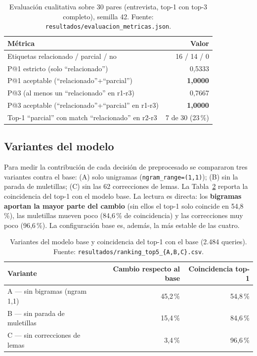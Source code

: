 \documentclass[11pt]{tg_usta}
\begin{document}
\begin{table}[H]
    \centering
    \caption{Evaluación cualitativa sobre 30 pares (entrevista, top-1 con top-3 completo), semilla 42. Fuente: \texttt{resultados/evaluacion\_metricas.json}.}
    \small
    \setlength{\tabcolsep}{6pt}
    \begin{tabular}{l r}
    \toprule
    Métrica & Valor \\
    \midrule
    Etiquetas relacionado / parcial / no & 16 / 14 / 0 \\
    P@1 estricto (solo ``relacionado'') & 0,5333 \\
    P@1 aceptable (``relacionado''+``parcial'') & \textbf{1,0000} \\
    P@3 (al menos un ``relacionado'' en r1-r3) & 0,7667 \\
    P@3 aceptable (``relacionado''+``parcial'' en r1-r3) & \textbf{1,0000} \\
    Top-1 ``parcial'' con match ``relacionado'' en r2-r3 & 7 de 30 (23\,\%) \\
    \bottomrule
    \end{tabular}
    \label{tab:evaluacion}
\end{table}

\subsection{Variantes del modelo}

Para medir la contribución de cada decisión de preprocesado se compararon tres variantes contra el base: (A) solo unigramas (\texttt{ngram\_range=(1,1)}); (B) sin la parada de muletillas; (C) sin las 62 correcciones de lemas. La Tabla~\ref{tab:variantes} reporta la coincidencia del top-1 con el modelo base. La lectura es directa: los \textbf{bigramas aportan la mayor parte del cambio} (sin ellos el top-1 solo coincide en 54,8\,\%), las muletillas mueven poco (84,6\,\% de coincidencia) y las correcciones muy poco (96,6\,\%). La configuración base es, además, la más estable de las cuatro.

\begin{table}[H]
    \centering
    \caption{Variantes del modelo base y coincidencia del top-1 con el base (2.484 queries). Fuente: \texttt{resultados/ranking\_top5\_\{A,B,C\}.csv}.}
    \small
    \setlength{\tabcolsep}{6pt}
    \begin{tabular}{l r r}
    \toprule
    Variante & Cambio respecto al base & Coincidencia top-1 \\
    \midrule
    A --- sin bigramas (ngram 1,1) & 45,2\,\% & 54,8\,\% \\
    B --- sin parada de muletillas & 15,4\,\% & 84,6\,\% \\
    C --- sin correcciones de lemas & 3,4\,\% & 96,6\,\% \\
    \bottomrule
    \end{tabular}
    \label{tab:variantes}
\end{table}
\end{document}
